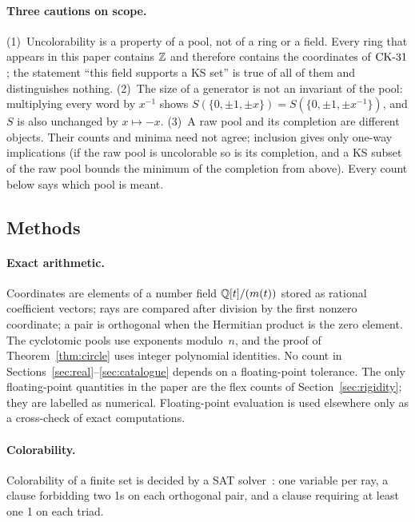 \paragraph{Three cautions on scope.}
(1)~Uncolorability is a property of a pool, not of a ring or a field.  Every ring that appears in
this paper contains $\mathbb{Z}$ and therefore contains the coordinates of $\mathrm{CK}\text{-}31$; the statement ``this
field supports a KS set'' is true of all of them and distinguishes nothing.  (2)~The size of a
generator is not an invariant of the pool: multiplying every word by $x^{-1}$ shows
$S(\{0,\pm1,\pm x\})=S(\{0,\pm1,\pm x^{-1}\})$, and $S$ is also unchanged by $x\mapsto-x$.
(3)~A raw pool and its completion are different objects.  Their counts and minima need not
agree; inclusion gives only one-way implications (if the raw pool is uncolorable so is its
completion, and a KS subset of the raw pool bounds the minimum of the completion from above).
Every count below says which pool is meant.

\subsection{Methods}\label{sec:methods}

\paragraph{Exact arithmetic.}  Coordinates are elements of a number field $\mathbb{Q}[t]/(m(t))$ stored
as rational coefficient vectors; rays are compared after division by the first nonzero
coordinate; a pair is orthogonal when the Hermitian product is the zero element.  The
cyclotomic pools use exponents modulo~$n$, and the proof of Theorem~\ref{thm:circle} uses
integer polynomial identities.  No count in Sections~\ref{sec:real}--\ref{sec:catalogue} depends
on a floating-point tolerance.  The only floating-point quantities in the paper are the flex
counts of Section~\ref{sec:rigidity}; they are labelled as numerical.  Floating-point
evaluation is used elsewhere only as a cross-check of exact computations.

\paragraph{Colorability.}  Colorability of a finite set is decided by a SAT
solver~\cite{AudemardSimon2018}: one variable per ray, a clause forbidding two 1s on each
orthogonal pair, and a clause requiring at least one 1 on each triad.

